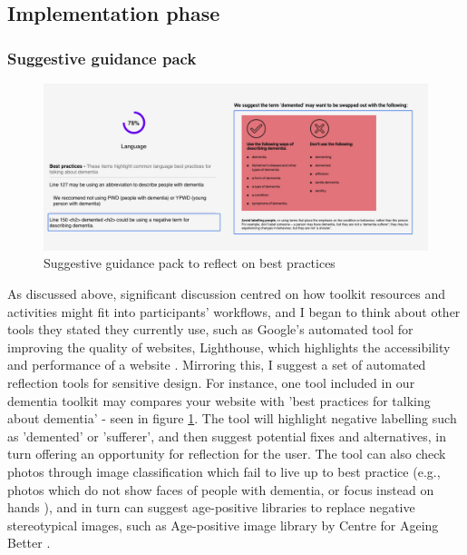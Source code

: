\subsection{Implementation phase}
\subsubsection{Suggestive guidance pack}
\begin{figure}[h]
\centering
\includegraphics[width=1\linewidth]{Images/D3Toolkit/Fig10.png}
\caption{Suggestive guidance pack to reflect on best practices}
\label{fig:suggestPack}
\end{figure}
As discussed above, significant discussion centred on how toolkit resources and activities might fit into participants’ workflows, and I began to think about other tools they stated they currently use, such as Google’s automated tool for improving the quality of websites, Lighthouse, which highlights the accessibility and performance of a website \citep{chrome_lighthouse_2021}. Mirroring this, I suggest a set of automated reflection tools for sensitive design. For instance, one tool included in our dementia toolkit may compares your website with 'best practices for talking about dementia' - seen in figure \ref{fig:suggestPack}. The tool will highlight negative labelling such as 'demented' or 'sufferer', and then suggest potential fixes and alternatives, in turn offering an opportunity for reflection for the user. The tool can also check photos through image classification which fail to live up to best practice (e.g., photos which do not show faces of people with dementia, or focus instead on hands \citep{low2020negative}), and in turn can suggest age-positive libraries to replace negative stereotypical images, such as Age-positive image library by Centre for Ageing Better \citep{noauthor_age-positive_nodate}.

